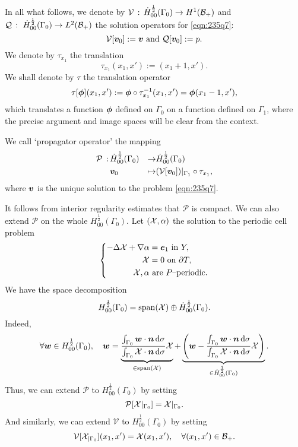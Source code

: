 \documentclass[a4paper,10pt,reqno]{amsart}
\begin{document}
In all what follows, we denote by $\mathcal{V}\,:\,\dot{H}^{\frac{1}{2}}_{00}(\Gamma_0)\to H^{1}(\mathcal{B}_+)$ and
$\mathcal{Q}\,:\ \dot{H}^{\frac{1}{2}}_{00}(\Gamma_0)\to L^{2}(\mathcal{B}_+)$ the solution
operators for \cref{eqn:235q7}: 
\[
    \mathcal{V}[{\bm v}_0]:={\bm v} \text{ and }\mathcal{Q}[{\bm v}_0]:=p.
\] 
We denote by $\tau_{x_1}$ the translation     
\[
\tau_{x_1}(x_1,x'):=(x_1+1,x').
\] 
We shall denote by $\tau$   
 the translation operator 
\[
    \tau[\pphi](x_1,x'):=\pphi\circ \tau_{x_1}^{-1}(x_1,x')=\pphi(x_1-1,x'),    
\]                        %
which translates a function ${\bm \phi}$ defined on $\Gamma_0$ on a function defined on
$\Gamma_1$, 
where the precise argument and image spaces will be clear from the context. 
\begin{definition}        %
    We call `propagator operator' the mapping   
    \begin{equation}
    \label{eqn:6gnkg}   
    \begin{aligned}
        \mathcal{P}\,:\,& \dotH&  \to & \dotH \\  
        & \v_0 &  \mapsto & (\mathcal{V}[\v_0])|_{\Gamma_1}\circ \tau_{x_1},
    \end{aligned}
    \end{equation}
    where ${\bm v}$ is the unique solution to the problem \cref{eqn:235q7}.
\end{definition}
It follows from interior regularity estimates that $\mathcal{P}$ is compact. We can
also extend $\mathcal{P}$ on the whole $H_{00}^{\frac{1}{2}}(\Gamma_0)$.
Let $(\mathcal{X},\alpha)$ the solution to the periodic cell problem   
\[
\left\{\begin{aligned}
        -\Delta \mathcal{X}+\nabla\alpha &=  {\bm e}_1 \textrm{ in } Y,\\ 
        \mathcal{X} &= 0\textrm{ on } \partial T,\\  
        \mathcal{X},\alpha &\text{ are $P$--periodic}.
\end{aligned}
\right.
\] 
We have the space decomposition     
\[
    H_{00}^{\frac{1}{2}}(\Gamma_0) = \mathrm{span}(\mathcal{X})\oplus \dot{H}^{\frac{1}{2}}_{00}(\Gamma_0).
\] 
Indeed,     
\[
\forall {\bm w}\in H_{00}^{\frac{1}{2}}(\Gamma_0),\quad
{\bm w}=\underbrace{\frac{\int_{\Gamma_0}{\bm w}\cdot{\bm n}\,\mathrm{d}\sigma}{\int_{\Gamma_0}\mathcal{X}\cdot{\bm n}\,\mathrm{d}
\sigma} \mathcal{X}}_{\in \mathrm{span}(\mathcal{X})}
+\underbrace{\left( {\bm w}-\frac{\int_{\Gamma_0}{\bm w}\cdot{\bm n}\,\mathrm{d}\sigma}{\int_{\Gamma_0}\mathcal{X}\cdot{\bm n}\,\mathrm{d}
\sigma} \mathcal{X} \right)}_{\in \dot{H}^{\frac{1}{2}}_{00}(\Gamma_0)}.
\] 
Thus, we can extend $\mathcal{P}$ to $H^{\frac{1}{2}}_{00}(\Gamma_0)$ by setting     
\[
    \mathcal{P}[\mathcal{X}|_{\Gamma_0}] = \mathcal{X}|_{\Gamma_0}.
\] 
And similarly, we can extend $\mathcal{V}$ to $H^{\frac{1}{2}}_{00}(\Gamma_0)$ by setting     
\[
    \mathcal{V}[\mathcal{X}_{|\Gamma_0}](x_1,x')=\mathcal{X}(x_1,x'),\quad \forall (x_1,x')\in
    \mathcal{B}_+.
\] 
\end{document}
